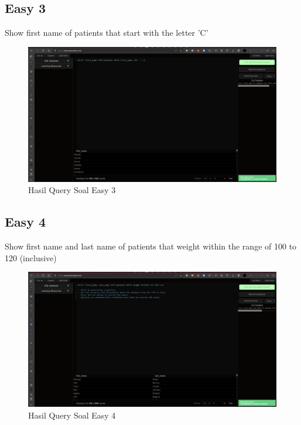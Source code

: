 \documentclass[]{article}
\begin{document}
\subsection{Easy 3}
Show first name of patients that start with the letter 'C'

\begin{figure}[H]
    \centering
    \includegraphics[width=12cm]{easy-3.png}
    \caption{Hasil Query Soal Easy 3}
\end{figure}
\subsection{Easy 4}
Show first name and last name of patients that weight within the range of 100 to 120 (inclusive)

\begin{figure}[H]
    \centering
    \includegraphics[width=12cm]{easy-4.png}
    \caption{Hasil Query Soal Easy 4}
\end{figure}
\end{document}
